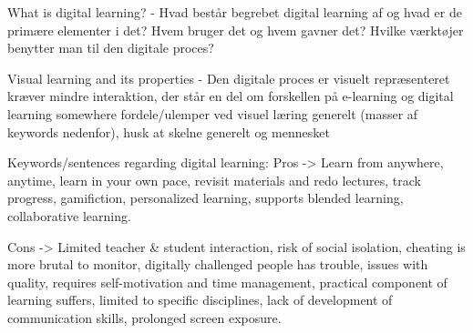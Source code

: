 What is digital learning? - Hvad består begrebet digital learning af og hvad er de primære elementer i det? 
    Hvem bruger det og hvem gavner det? 
    Hvilke værktøjer benytter man til den digitale proces?

  Visual learning and its properties - Den digitale proces er visuelt repræsenteret
    kræver mindre interaktion, der står en del om forskellen på e-learning og digital learning somewhere
    fordele/ulemper ved visuel læring generelt (masser af keywords nedenfor), husk at skelne generelt og mennesket

Keywords/sentences regarding digital learning: 
  Pros -> Learn from anywhere, anytime, learn in your own pace, revisit materials and redo lectures, track progress, gamifiction, personalized learning, supports blended learning, collaborative learning.

  Cons -> Limited teacher & student interaction, risk of social isolation, cheating is more brutal to monitor, digitally challenged people has trouble, issues with quality, requires self-motivation and time management, practical component of learning suffers, limited to specific disciplines, lack of development of communication skills, prolonged screen exposure.
